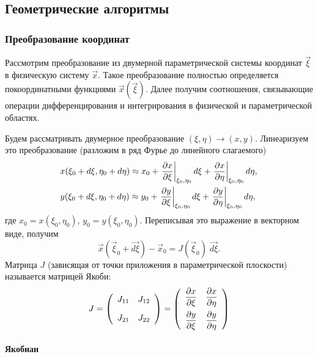 \subsection{Геометрические алгоритмы}
\subsubsection{Преобразование координат}
\label{sec:coo_transform} 
Рассмотрим преобразование
из двумерной параметрической системы координат $\vec \xi$ 
в физическую систему $\vec x$.
Такое преобразование полностью определяется покоординатными
функциями $\vec x(\vec \xi)$.
Далее получим соотношения, связывающие операции дифференцирования
и интегрирования в физической и параметрической областях.

Будем рассматривать двумерное преобразование $(\xi, \eta) \to (x, y)$.
Линеаризуем это преобразование (разложим в ряд Фурье до линейного слагаемого)
\begin{align*}
& x(\xi_0 + d\xi, \eta_0 + d\eta) \approx x_0 + \left.\frac{\partial x}{\partial \xi}\right|_{\xi_0, \eta_0} d\xi
    + \left.\frac{\partial x}{\partial \eta}\right|_{\xi_0, \eta_0} d\eta, \\
& y(\xi_0 + d\xi, \eta_0 + d\eta) \approx y_0 + \left.\frac{\partial y}{\partial \xi}\right|_{\xi_0, \eta_0} d\xi
    + \left.\frac{\partial y}{\partial \eta}\right|_{\xi_0, \eta_0} d\eta,
\end{align*}
где $x_0 = x(\xi_0, \eta_0)$, $y_0 = y(\xi_0, \eta_0)$.
Переписывая это выражение в векторном виде, получим
\begin{equation}
\label{eq:jacobi_linear}
\vec{x}(\vec \xi_0 + \vec{d\xi} ) - \vec{x}_0 = J(\vec \xi_0) \; \vec{d\xi}.
\end{equation}
Матрица $J$ (зависящая от точки приложения в параметрической плоскости) называется матрицей Якоби:
\begin{equation}
\label{eq:jacobi_matrix_2d}
J = \left(
	\begin{array}{cc}
	J_{11} & J_{12}\\[10pt]
	J_{21} & J_{22}\\
	\end{array}
\right)
= \left(
	\begin{array}{cc}
	\dfrac{\partial x}{\partial \xi} & \dfrac{\partial x}{\partial \eta}\\[10pt]
	\dfrac{\partial y}{\partial \xi} & \dfrac{\partial y}{\partial \eta}\\
	\end{array}
\right)
\end{equation}

\paragraph{Якобиан}

